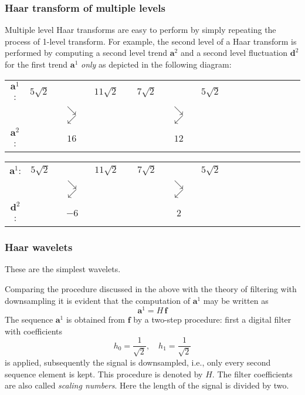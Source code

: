\documentclass[a4paper,11pt]{report}
\begin{document}
\subsubsection*{Haar transform of multiple levels}
Multiple level Haar transforms are easy to perform by simply repeating the process of 1-level transform. For example, the second level of a Haar transform is performed by computing a second level trend $\mathbf{a}^{2}$ and a second level fluctuation $\mathbf{d}^{2}$ for the first trend $\mathbf{a}^{1}$ \emph{only} as depicted in the following diagram:
\begin{center}
\begin{tabular}{cccccccccccccccc}
$\mathbf{a}^{1}$: & $5\sqrt{2}$ & & $11\sqrt{2}$ & & $7\sqrt{2}$ & & $5\sqrt{2}$   \\
 &   & $\searrow$$\swarrow$ & & & & $\searrow$$\swarrow$ &  \\
$\mathbf{a}^{2}$: & & $16$ & & & & $12$ &    
\end{tabular}
\end{center}

\begin{center}
\begin{tabular}{cccccccccccccccc}
$\mathbf{a}^{1}$: & $5\sqrt{2}$ & & $11\sqrt{2}$ & & $7\sqrt{2}$ & & $5\sqrt{2}$   \\
 &   & $\searrow$$\swarrow$ & & & & $\searrow$$\swarrow$ &  \\
$\mathbf{d}^{2}$: & & $-6$ & & & & $2$ &    
\end{tabular}
\end{center}

\subsubsection{Haar wavelets}
These are the simplest wavelets. 

Comparing the procedure discussed in the above with the theory of filtering with downsampling it is evident that the computation of $\mathbf{a}^{1}$ may be written as 
\begin{equation}
\mathbf{a}^{1} = H \,\mathbf{f}
\end{equation}
The sequence $\mathbf{a}^{1}$ is obtained from $\mathbf{f}$ by a two-step procedure: first a digital filter with coefficients
\begin{displaymath}
h_{0}=\frac{1}{\sqrt{2}}, \quad h_{1}=\frac{1}{\sqrt{2}}
\end{displaymath}
is applied, subsequently the signal is downsampled, i.e., only every second sequence element is kept. This procedure is denoted by $H$. The filter coefficients are also called \emph{scaling numbers}. Here the length of the signal is divided by two.
\end{document}
